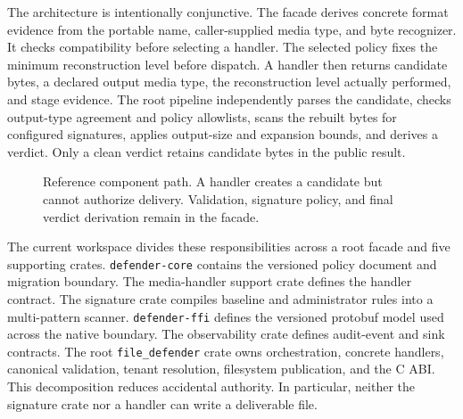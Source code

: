The architecture is intentionally conjunctive. The facade derives concrete
format evidence from the portable name, caller-supplied media type, and byte
recognizer. It checks compatibility before selecting a handler. The selected
policy fixes the minimum reconstruction level before dispatch. A handler then
returns candidate bytes, a declared output media type, the reconstruction
level actually performed, and stage evidence. The root pipeline independently
parses the candidate, checks output-type agreement and policy allowlists, scans
the rebuilt bytes for configured signatures, applies output-size and expansion
bounds, and derives a verdict. Only a clean verdict retains candidate bytes in
the public result.

\begin{figure}[t]
\centering
{}
\caption{Reference component path. A handler creates a candidate but cannot
authorize delivery. Validation, signature policy, and final verdict derivation
remain in the facade.}
\label{fig:component-architecture}
\end{figure}

The current workspace divides these responsibilities across a root facade and
five supporting crates. \texttt{defender-core} contains the versioned policy
document and migration boundary. The media-handler support crate defines the
handler contract. The signature crate compiles baseline and
administrator rules into a multi-pattern scanner. \texttt{defender-ffi}
defines the versioned protobuf model used across the native boundary.
The observability crate defines audit-event and sink contracts. The root
\texttt{file\_defender} crate owns orchestration, concrete handlers,
canonical validation, tenant resolution, filesystem publication, and the C
ABI. This decomposition reduces accidental authority. In particular, neither
the signature crate nor a handler can write a deliverable file.

